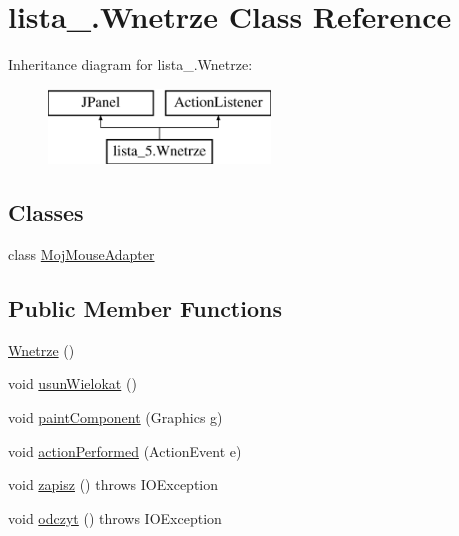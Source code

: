 \hypertarget{classlista__5_1_1_wnetrze}{}\section{lista\+\_.\+Wnetrze Class Reference}
\label{classlista__5_1_1_wnetrze}
Inheritance diagram for lista\+\_.\+Wnetrze\+:\begin{figure}[H]
\begin{center}
\leavevmode
\includegraphics[height=2.000000cm]{classlista__5_1_1_wnetrze}
\end{center}
\end{figure}
\subsection*{Classes}
\begin{DoxyCompactItemize}
\item 
class \mbox{\hyperlink{classlista__5_1_1_wnetrze_1_1_moj_mouse_adapter}{Moj\+Mouse\+Adapter}}
\end{DoxyCompactItemize}
\subsection*{Public Member Functions}
\begin{DoxyCompactItemize}
\item 
\mbox{\hyperlink{classlista__5_1_1_wnetrze_a7fc5065e5b578f1613050a099df86864}{Wnetrze}} ()
\item 
void \mbox{\hyperlink{classlista__5_1_1_wnetrze_aa5e96d1ba61b233b93c6d8a71931be07}{usun\+Wielokat}} ()
\item 
void \mbox{\hyperlink{classlista__5_1_1_wnetrze_aa8676192e150a17230d72de122744a47}{paint\+Component}} (Graphics g)
\item 
void \mbox{\hyperlink{classlista__5_1_1_wnetrze_a2f9c15a3d95e323370ae52a28881d73f}{action\+Performed}} (Action\+Event e)
\item 
void \mbox{\hyperlink{classlista__5_1_1_wnetrze_a3f2f50d048d7c41f2cbbb7f91f59c077}{zapisz}} ()  throws I\+O\+Exception      
\item 
void \mbox{\hyperlink{classlista__5_1_1_wnetrze_ad5ebd5c04f2c4b9de6954303c96a5856}{odczyt}} ()  throws I\+O\+Exception     
\end{DoxyCompactItemize}
